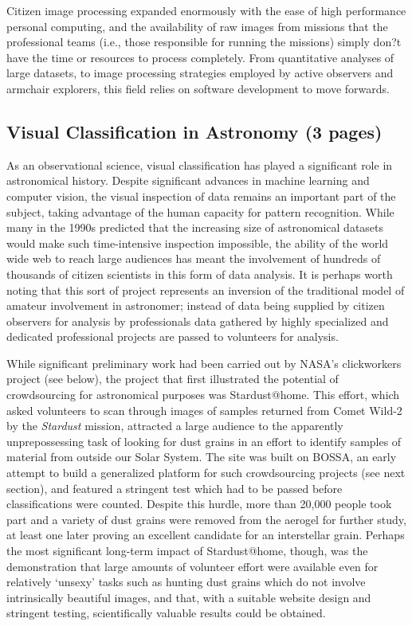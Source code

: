 \documentclass{ar2e}
\begin{document}
Citizen image processing expanded enormously with the ease of high performance
personal computing, and the availability of raw images from missions that the
professional teams (i.e., those responsible for running the missions) simply
don?t have the time or resources to process completely.  From quantitative
analyses of large datasets, to image processing strategies employed by active
observers and armchair explorers, this field relies on software development to
move forwards.


\subsection{Visual Classification in Astronomy (3 pages)}
\label{sec:class:astro}

As an observational science, visual classification has played a significant
role in astronomical history. Despite significant advances in machine learning
and computer vision, the visual inspection of data remains an important part
of the subject, taking advantage of the human capacity for pattern
recognition. While many in the 1990s predicted that the increasing size of
astronomical datasets would make such time-intensive inspection impossible,
the ability of the world wide web to reach large audiences has meant the
involvement of hundreds of thousands of citizen scientists in this form of
data analysis. It is perhaps worth noting that this sort of project represents
an inversion of the traditional model of amateur involvement in astronomer;
instead of data being supplied by citizen observers for analysis by
professionals data gathered by highly specialized and dedicated professional
projects are passed to volunteers for analysis. 


While significant preliminary work had been carried out by NASA's clickworkers
project (see below), the project that first illustrated the potential of
crowdsourcing for astronomical purposes was Stardust@home. This effort, which
asked volunteers to scan through images of samples returned from Comet Wild-2
by the \emph{Stardust} mission, attracted a large audience to the apparently
unprepossessing task of looking for dust grains in an effort to identify
samples of material from outside our Solar System. The site was built on
BOSSA, an early attempt to build a generalized platform for such crowdsourcing
projects (see next section), and featured a stringent test which had to be
passed before classifications were counted. Despite this hurdle, more than
20,000 people took part and a variety of dust grains were removed from the
aerogel for further study, at least one later proving an excellent candidate
for an interstellar grain. Perhaps the most significant long-term impact of
Stardust@home, though, was the demonstration that large amounts of volunteer
effort were available even for relatively `unsexy' tasks such as hunting dust
grains which do not involve intrinsically beautiful images, and that, with a
suitable website design and stringent testing, scientifically valuable results
could be obtained. 
\end{document}
